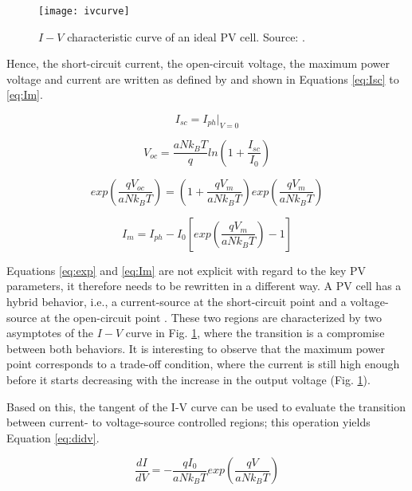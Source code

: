 \begin{figure}[h]
\texttt{[image: ivcurve]}
\centering
\caption{$ I-V $ characteristic curve of an ideal PV cell. Source: \cite{Saloux}.}
\label{fig:ivcurve}
\end{figure}

Hence, the short-circuit current, the open-circuit voltage, the maximum power voltage and current are written as defined by \cite{Saloux} and shown in Equations \ref{eq:Isc} to \ref{eq:Im}.

\begin{equation}
\label{eq:Isc}
I_{sc}=I_{ph}\vert_{V=0}
\end{equation}

\begin{equation}
\label{eq:Voc}
V_{oc}=\dfrac{aNk_{B}T}{q}ln\left( 1+\dfrac{I_{sc}}{I_{0}} \right) 
\end{equation}

\begin{equation}
\label{eq:exp}
exp\left( \dfrac{qV_{oc}}{aNk_{B}T} \right) = \left(1+\dfrac{qV_{m}}{aNk_{B}T} \right) exp \left( \dfrac{qV_{m}}{aNk_{B}T} \right) 
\end{equation}

\begin{equation}
\label{eq:Im}
I_{m} =I_{ph}-I_{0}\left[ exp \left( \dfrac{qV_{m}}{aNk_{B}T} \right) -1 \right] 
\end{equation}

Equations \ref{eq:exp} and \ref{eq:Im} are not explicit with regard to the key PV  parameters, it therefore needs to be rewritten in a different way. A PV cell has a hybrid behavior, i.e., a current-source at the short-circuit point and a voltage-source at the open-circuit point \cite{Saloux}. These two regions are characterized by two asymptotes of the $ I-V $ curve in Fig. \ref{fig:ivcurve}, where the transition is a compromise between both behaviors. It is interesting to observe that the maximum power point corresponds to a trade-off condition, where the current is still high enough before it starts decreasing with the increase in the output voltage (Fig. \ref{fig:ivcurve}).

Based on this, the tangent of the I-V curve can be used to evaluate the transition between current- to voltage-source controlled regions; this operation yields Equation \ref{eq:didv}.

\begin{equation}
\label{eq:didv}
\dfrac{dI}{dV}=-\dfrac{qI_{0}}{aNk_{B}T}exp \left( \dfrac{qV}{aNk_{B}T}  \right) 
\end{equation}

